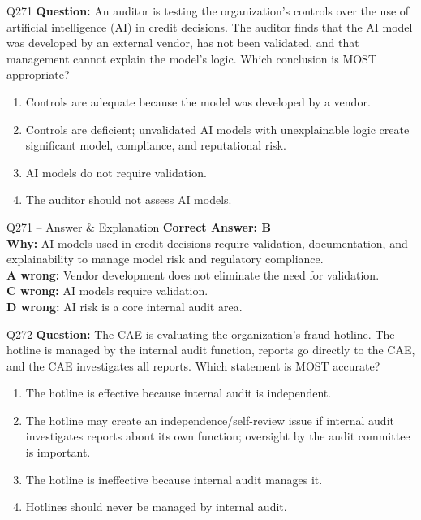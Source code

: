 \documentclass[aspectratio=169,10pt]{beamer}
\begin{document}
	\begin{frame}[t]{Q271}
		\small
		\textbf{Question:} An auditor is testing the organization's controls over the use of artificial intelligence (AI) in credit decisions. The auditor finds that the AI model was developed by an external vendor, has not been validated, and that management cannot explain the model's logic. Which conclusion is MOST appropriate?
		\begin{enumerate}[label=\Alph*.,itemsep=1pt,topsep=2pt]
			\item Controls are adequate because the model was developed by a vendor.
			\item Controls are deficient; unvalidated AI models with unexplainable logic create significant model, compliance, and reputational risk.
			\item AI models do not require validation.
			\item The auditor should not assess AI models.
		\end{enumerate}
	\end{frame}
	
	\begin{frame}[t]{Q271 -- Answer \& Explanation}
		\small
		\textbf{Correct Answer: B} \\[4pt]
		\textbf{Why:} AI models used in credit decisions require validation, documentation, and explainability to manage model risk and regulatory compliance. \\[4pt]
		\textbf{A wrong:} Vendor development does not eliminate the need for validation. \\[2pt]
		\textbf{C wrong:} AI models require validation. \\[2pt]
		\textbf{D wrong:} AI risk is a core internal audit area.
	\end{frame}
	
	\begin{frame}[t]{Q272}
		\small
		\textbf{Question:} The CAE is evaluating the organization's fraud hotline. The hotline is managed by the internal audit function, reports go directly to the CAE, and the CAE investigates all reports. Which statement is MOST accurate?
		\begin{enumerate}[label=\Alph*.,itemsep=1pt,topsep=2pt]
			\item The hotline is effective because internal audit is independent.
			\item The hotline may create an independence/self-review issue if internal audit investigates reports about its own function; oversight by the audit committee is important.
			\item The hotline is ineffective because internal audit manages it.
			\item Hotlines should never be managed by internal audit.
		\end{enumerate}
	\end{frame}
	
\end{document}
